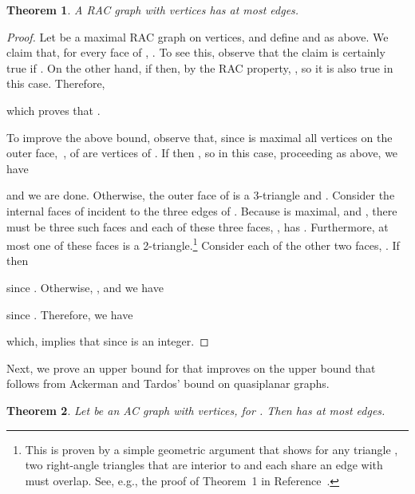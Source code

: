 \documentclass{patmorin}
\newtheorem{thm}{Theorem}
\begin{document}
\begin{thm}
A RAC graph with  vertices has at most  edges.
\end{thm}
\begin{proof}
Let  be a maximal RAC graph on  vertices, and define  and 
as above.  We claim that, for every face  of , .
To see this, observe that the claim is certainly true if .  On
the other hand, if  then, by the RAC property, , so it
is also true in this case.
Therefore,

which proves that .

To improve the above bound, observe that, since  is maximal all vertices
on the outer face,~, of  are vertices of .  If  then
, so in this case, proceeding as above, we have

and we are done.  Otherwise, the outer face of  is a 3-triangle and
.
Consider the internal faces of  incident to the three edges of .
Because  is maximal, and , there must
be three such faces and each of these three faces, , has .
Furthermore, at most one of these faces is a 2-triangle.\footnote{This is proven by a simple geometric argument that shows for
any triangle , two right-angle triangles that are interior to 
and each share an edge with  must overlap. See, e.g., the proof of
Theorem~1 in Reference~\cite{del-dgrac-09}.}
Consider each of the other two faces, .  If  then

since .
Otherwise, , and we have 

since .
Therefore, we have

which, implies that  since  is an integer.
\end{proof}

Next, we prove an upper bound for  that improves on the
 upper bound that follows from Ackerman and Tardos' bound on
quasiplanar graphs.

\begin{thm}\label{thm:six-n}
Let  be an AC graph with  vertices, for .
Then  has at most  edges.
\end{thm}
\end{document}
